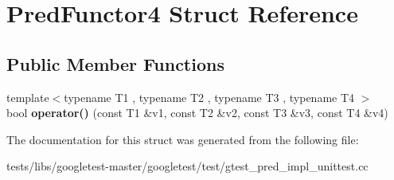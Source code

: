 \hypertarget{structPredFunctor4}{}\section{Pred\+Functor4 Struct Reference}
\label{structPredFunctor4}
\subsection*{Public Member Functions}
\begin{DoxyCompactItemize}
\item 
\mbox{\label{structPredFunctor4_a6cfb6ccd9a66bf93d9c43a49575e3869}} 
{\footnotesize template$<$typename T1 , typename T2 , typename T3 , typename T4 $>$ }\\bool {\bfseries operator()} (const T1 \&v1, const T2 \&v2, const T3 \&v3, const T4 \&v4)
\end{DoxyCompactItemize}


The documentation for this struct was generated from the following file\+:\begin{DoxyCompactItemize}
\item 
tests/libs/googletest-\/master/googletest/test/gtest\+\_\+pred\+\_\+impl\+\_\+unittest.\+cc\end{DoxyCompactItemize}
